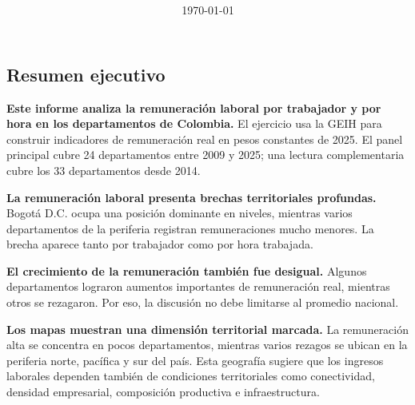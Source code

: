 \documentclass[12pt, a4paper]{article}
\title{\reporttitle\\\reportsubtitle}
\author{\reportauthorone \and \reportauthortwo}
\date{\today}
\begin{document}


\begin{mdframed}[
  linewidth=1pt,
  linecolor=gray!60,
  backgroundcolor=gray!6,
  innertopmargin=12pt,
  innerbottommargin=12pt,
  innerleftmargin=14pt,
  innerrightmargin=14pt
]
\section*{Resumen ejecutivo}

\textbf{Este informe analiza la remuneración laboral por trabajador y por hora en los departamentos de Colombia.} El ejercicio usa la GEIH para construir indicadores de remuneración real en pesos constantes de 2025. El panel principal cubre 24 departamentos entre 2009 y 2025; una lectura complementaria cubre los 33 departamentos desde 2014.

\textbf{La remuneración laboral presenta brechas territoriales profundas.} Bogotá D.C. ocupa una posición dominante en niveles, mientras varios departamentos de la periferia registran remuneraciones mucho menores. La brecha aparece tanto por trabajador como por hora trabajada.

\textbf{El crecimiento de la remuneración también fue desigual.} Algunos departamentos lograron aumentos importantes de remuneración real, mientras otros se rezagaron. Por eso, la discusión no debe limitarse al promedio nacional.

\textbf{Los mapas muestran una dimensión territorial marcada.} La remuneración alta se concentra en pocos departamentos, mientras varios rezagos se ubican en la periferia norte, pacífica y sur del país. Esta geografía sugiere que los ingresos laborales dependen también de condiciones territoriales como conectividad, densidad empresarial, composición productiva e infraestructura.
\end{mdframed}

\newpage
\tableofcontents
\newpage


\end{document}
